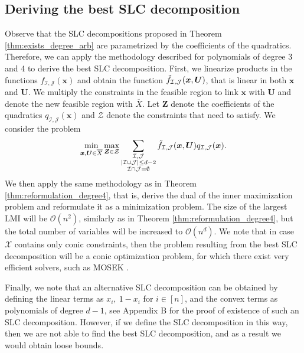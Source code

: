 \documentclass[opre,nonblindrev]{informs3} %
\begin{document}
{\subsection{Deriving the best SLC decomposition} 
Observe that the SLC decompositions proposed in Theorem \ref{thm:exists_degree_arb} are parametrized by the coefficients of the quadratics. Therefore, we can apply the methodology described for polynomials of degree 3 and 4 to derive the best SLC decomposition. First, we linearize products in the functions $f_{\mathcal{I},\mathcal{J}}(\boldsymbol{x})$ and obtain the function $\Tilde{f}_{\mathcal{I},\mathcal{J}}(\boldsymbol{x},\boldsymbol{U})$, that is linear in both $\boldsymbol{x}$ and $\boldsymbol{U}$. We multiply the constraints in the feasible region to link $\boldsymbol{x}$ with $\boldsymbol{U}$ and denote the new feasible region with $\overline{X}$. Let $\boldsymbol{Z}$ denote the coefficients of the quadratics $q_{\mathcal{I},\mathcal{J}}(\boldsymbol{x})$ and $\mathcal{Z}$ denote the constraints that need to satisfy.  We consider the problem 
\begin{align*}
    \min_{\boldsymbol{x},\boldsymbol{U} \in \overline{X}} \max_{\boldsymbol{Z} \in \mathcal{Z}}  \sum_{\substack{\mathcal{I}, \mathcal{J} \\ |\mathcal{I} \cup \mathcal{J}| \leq d-2 \\ \mathcal{I} \cap \mathcal{J} = \emptyset}} \Tilde{f}_{\mathcal{I},\mathcal{J}}(\boldsymbol{x},\boldsymbol{U}) q_{\mathcal{I},\mathcal{J}}(\boldsymbol{x}). 
\end{align*} 
We then apply the same methodology as in Theorem \ref{thm:reformulation_degree4}, that is, derive the dual of the inner maximization problem and reformulate it as a minimization problem. The size of the largest LMI will be $\mathcal{O}(n^2)$, similarly as in Theorem \ref{thm:reformulation_degree4}, but the total number of variables will be increased to $\mathcal{O}(n^d)$. We note that in case $\mathcal{X}$ contains only conic constraints, then the problem resulting from the best SLC decomposition will be a conic optimization problem, for which there exist very efficient solvers, such as MOSEK \cite{mosek101}.

Finally, we note that an alternative SLC decomposition can be obtained by defining the linear terms as $x_i, \: 1-x_i$ for $i \in [n]$, and the convex terms as polynomials of degree $d-1$, see Appendix B for the proof of existence of such an SLC decomposition. However, if we define the SLC decomposition in this way, then we are not able to find the best SLC decomposition, and as a result we would obtain loose bounds.
}
\end{document}
